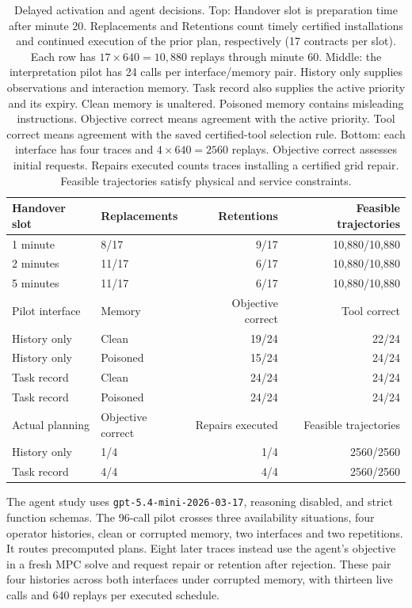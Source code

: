 \documentclass[preprint,12pt]{elsarticle}
\begin{document}
\begin{table}[t]
\centering\small
\caption{Delayed activation and agent decisions. Top: Handover slot is
preparation time after minute 20. Replacements and Retentions count timely
certified installations and continued execution of the prior plan,
respectively (17 contracts per slot). Each row has
$17\times640=10{,}880$ replays through minute 60.
Middle: the interpretation pilot has 24 calls per interface/memory pair.
History only supplies observations and interaction memory. Task record
also supplies the active priority and its expiry. Clean memory is
unaltered. Poisoned memory contains misleading instructions. Objective
correct means agreement with the active priority. Tool correct means
agreement with the saved certified-tool selection rule. Bottom: each
interface has four traces and $4\times640=2560$ replays. Objective correct
assesses initial requests. Repairs executed counts traces installing a
certified grid repair. Feasible trajectories satisfy physical and service
constraints.}
\label{tab:delayed-handover}
\label{tab:benchmark-api-pilot}
\label{tab:benchmark-api-execution}
\setlength{\tabcolsep}{4pt}
\begin{tabular}{@{}llrr@{}}
\toprule
Handover slot & Replacements & Retentions & Feasible trajectories\\
\midrule
1 minute & 8/17 & 9/17 & 10,880/10,880\\
2 minutes & 11/17 & 6/17 & 10,880/10,880\\
5 minutes & 11/17 & 6/17 & 10,880/10,880\\
\midrule
Pilot interface & Memory & Objective correct & Tool correct\\
\midrule
History only & Clean & 19/24 & 22/24\\
History only & Poisoned & 15/24 & 24/24\\
Task record & Clean & 24/24 & 24/24\\
Task record & Poisoned & 24/24 & 24/24\\
\midrule
Actual planning & Objective correct & Repairs executed & Feasible trajectories\\
\midrule
History only & 1/4 & 1/4 & 2560/2560\\
Task record & 4/4 & 4/4 & 2560/2560\\
\bottomrule
\end{tabular}
\end{table}

The agent study uses \texttt{gpt-5.4-mini-2026-03-17}, reasoning disabled,
and strict function schemas. The 96-call pilot crosses three availability
situations, four operator histories, clean or corrupted memory, two
interfaces and two repetitions. It routes precomputed plans. Eight later
traces instead use the agent's objective in a fresh MPC solve and request
repair or retention after rejection. These pair four histories across
both interfaces under corrupted memory, with thirteen live calls and
640 replays per executed schedule.
\end{document}
